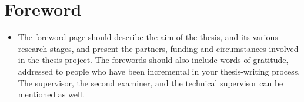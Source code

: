 \fancyfoot[LE,RO]{\thepage}
\section*{Foreword}
\begin{itemize}
\item The foreword page should describe the aim of the thesis, and its various research stages, and present the partners, funding and circumstances involved in the thesis project. The forewords should also include words of gratitude, addressed to people who have been incremental in your thesis-writing process. The supervisor, the second examiner, and the technical supervisor can be mentioned as well.

\end{itemize}


\clearpage

